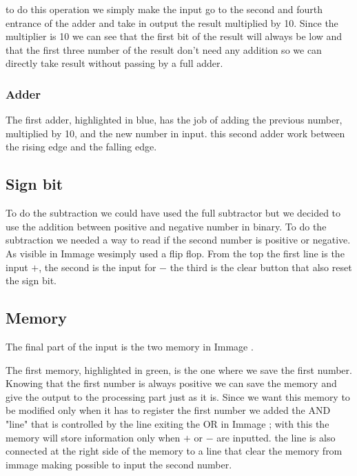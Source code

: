 \documentclass{article}
\begin{document}
\vspace{3mm}

to do this operation we simply make the input go to the second and fourth entrance of the adder and take in output the result multiplied by 10. Since the multiplier is 10 we can see that the first bit of the result will always be low and that the first three number of the result don't need any addition so we can directly take result without passing by a full adder.


\subsubsection{Adder}

The first adder, highlighted in blue, has the job of adding the previous number, multiplied by 10, and the new number in input. this second adder work between the rising edge and the falling edge.



\subsection{Sign bit}

To do the subtraction we could have used the full subtractor but we decided to use the addition between positive and negative number in binary. To do the subtraction we needed a way to read if the second number is positive or negative. As visible in Immage %
wesimply used a flip flop. 
From the top the first line is the input $+$, the second is the input for $-$ the third is the clear button that also reset the sign bit.




\subsection{Memory}
The final part of the input is the two memory in Immage %
.


\vspace{3mm}

The first memory, highlighted in green, is the one where we save the first number. 
Knowing that the first number is always positive we can save the memory and give the output to the processing part just as it is. 
Since we want this memory to be modified only when it has to register the first number we added the AND "line" that is controlled by the line exiting the OR in Immage%
; with this the memory will store information only when $+$ or $-$ are inputted. the line is also connected at the right side of the memory to a line that clear the memory from immage%
 making possible to input the second number.
\end{document}
